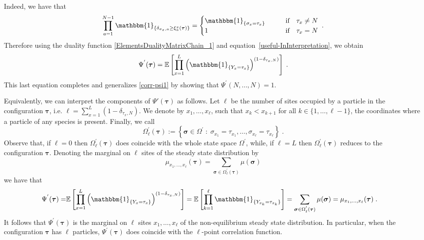\documentclass[10pt]{article}
\numberwithin{equation}{section}
\numberwithin{equation}{subsection}
\newcommand{\dt}{\;.}
\begin{document}
Indeed, we have that 
\begin{equation}
	\prod_{a=1}^{N-1}\mathbbm{1}_{\{\delta_{\sigma_{x},a}\geq\xi_{a}^{x}(\bm{\tau})\}}=\begin{cases}
		\mathbbm{1}_{\{\sigma_{x}=\tau_{x}\}}\qquad &\text{if}\quad \tau_{x}\neq N\\
		1\qquad  &\text{if}\quad \tau_{x}= N
	\end{cases}\dt
\end{equation}
Therefore using the duality function \eqref{ElementsDualityMatrixChain_1} and equation~\ref{useful-InInterpretation}, we obtain 
\begin{equation}%
	\Psi^{'}(\bm{\tau})=\mathbb{E}\left[\prod_{x=1}^{L}\left(\mathbbm{1}_{\{Y_{x}=\tau_{x}\}} \right)^{(1-\delta_{\tau_{x},N})}\right]\dt
\end{equation} 
This last equation completes and generalizes \eqref{corr-psi1} by showing that $\Psi^{'}(N,\ldots,N) =1$.

Equivalently, we can interpret the components of $\Psi'(\bm{\tau})$ as follows.
Let $\ell$ be the number of sites {\color{black}occupied by a particle} in the configuration $\bm{\tau}$, i.e.  $\ell=\sum_{x=1}^{L}(1-\delta_{\tau_{x},N})$. We denote by $x_{1},\ldots,x_{\ell}$, such that $x_{k}<x_{k+1}$ for all $k\in \{1,\ldots,\ell-1\}$, the coordinates where a particle of any species is present. Finally, we call 
\begin{equation}
	\Omega_{\ell}^{'}(\bm{\tau}):=\left\{\bm{\sigma}\in \Omega^{'}\;:\; \sigma_{x_{1}}=\tau_{x_{1}},\ldots,\sigma_{x_{\ell}}=\tau_{x_{\ell}}\right\}\dt
\end{equation} 
Observe that, if $\ell=0$ then $\Omega_{\ell}^{'}(\bm{\tau})$ does coincide with the whole state space $\Omega^{'}$, while, if $\ell=L$ then $\Omega_{\ell}^{'}(\bm{\tau})$ reduces to the configuration $\bm{\tau}$. Denoting the marginal on $\ell$ sites of the steady state distribution by 
\begin{equation}
	\mu_{x_{1},\ldots,x_{\ell}}(\bm{\tau})=\sum_{\bm{\sigma}\in \Omega_{\ell}^{'}(\bm{\tau})}\mu(\bm{\sigma})
\end{equation}
we have that 
\begin{align}
	\Psi^{'}(\bm{\tau})=&\mathbb{E}\left[\prod_{x=1}^{L}\left(\mathbbm{1}_{\{Y_{x}=\tau_{x}\}} \right)^{(1-\delta_{\tau_{x},N})}\right]=\mathbb{E}\left[\prod_{k=1}^{\ell}\mathbbm{1}_{\{Y_{x_{k}}=\tau_{x_{k}}\}}\right]=\sum_{\bm{\sigma}\in \Omega_{\ell}^{'}(\bm{\tau})}\mu(\bm{\sigma})=\mu_{x_{1},\ldots,x_{\ell}}(\bm{\tau})\dt
\end{align} 
It follows that $\Psi^{'}(\bm{\tau})$ is the marginal on $\ell$ sites $x_{1},\ldots,x_{\ell}$ of the non-equilibrium steady state distribution. In particular, when the configuration $\bm{\tau}$ has $\ell$ particles, $\Psi^{'}(\bm{\tau})$ does coincide with the $\ell$-point correlation function. 
\end{document}
